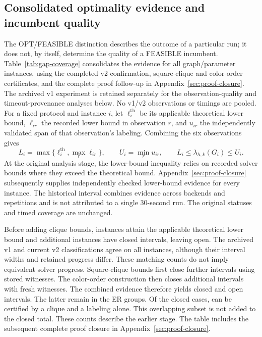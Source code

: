 \subsection{Consolidated optimality evidence and incumbent quality}
\label{sec:optimality-gaps}
The OPT/FEASIBLE distinction describes the outcome of a particular run;
it does not, by itself, determine the quality of a FEASIBLE incumbent.
Table~\ref{tab:gap-coverage} consolidates the evidence for all
\EvidenceInstances{} graph/parameter instances, using the completed v2
confirmation, square-clique and color-order certificates, and the
complete proof follow-up in Appendix~\ref{sec:proof-closure}.
The archived v1 experiment is retained separately for the observation-quality
and timeout-provenance analyses below. No v1/v2 observations or timings are pooled.
For a fixed protocol and instance $i$, let
$\ell_i^{\mathrm{th}}$ be its applicable theoretical lower bound,
$\ell_{ir}$ the recorded lower bound in observation $r$, and $u_{ir}$
the independently validated span of that observation's labeling. Combining
the six observations gives
\[
 L_i=\max\bigl\{\ell_i^{\mathrm{th}},\max_r\ell_{ir}\bigr\},
 \qquad U_i=\min_r u_{ir},
 \qquad L_i\leq\lambda_{h,k}(G_i)\leq U_i.
\]
At the original analysis stage, the lower-bound inequality relies on
recorded solver bounds where they exceed the theoretical bound.
Appendix~\ref{sec:proof-closure} subsequently supplies independently
checked lower-bound evidence for every instance. The historical interval combines
evidence across backends and repetitions and is not attributed to a single
30-second run. The original statuses and timed coverage are unchanged.

Before adding clique bounds, \EvidenceTheory{} instances attain the
applicable theoretical lower bound and \EvidenceOtherClosed{} additional
instances have closed intervals, leaving \EvidenceOpenBefore{} open.
The archived v1 and current v2 classifications agree on all
\EvidenceVOneSame{} instances, although their interval widths and retained
progress differ. These matching counts do not imply equivalent solver progress.
Square-clique bounds first close \EvidenceNewlyClosed{} further intervals
using stored witnesses. The color-order construction then closes
\ConstructionNewlyClosed{} additional intervals with fresh witnesses.
The combined evidence therefore yields \ConstructionClosed{} closed
and \ConstructionOpen{} open intervals. The latter remain in the ER
groups. Of the closed cases, \ConstructionCliqueCertified{} can be
certified by a clique and a labeling alone. This overlapping subset is
not added to the closed total. These counts describe the earlier stage. The table includes the
subsequent complete proof closure in Appendix~\ref{sec:proof-closure}.

